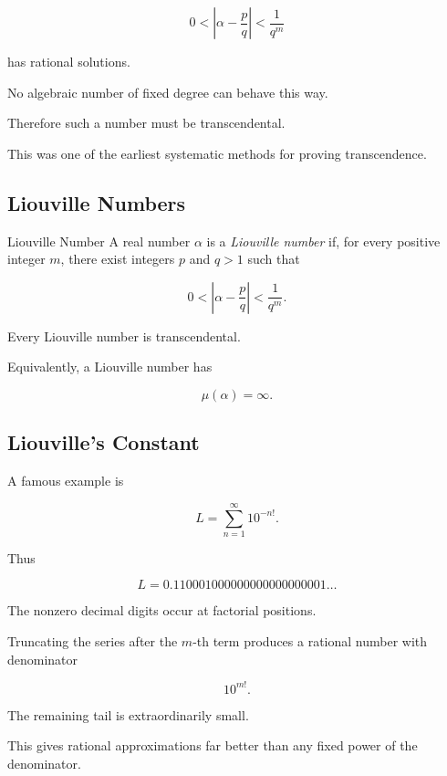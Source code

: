 \[ 0<\left|\alpha-\frac pq\right|<\frac1{q^m} \]

has rational solutions.

No algebraic number of fixed degree can behave this way.

Therefore such a number must be transcendental.

This was one of the earliest systematic methods for proving transcendence.

\subsection{Liouville Numbers}
\label{subsec:liouville-numbers}

\begin{definitionbox}{Liouville Number}
A real number \(\alpha\) is a \emph{Liouville number} if, for every positive
integer \(m\), there exist integers \(p\) and \(q>1\) such that

\[ 0<\left|\alpha-\frac pq\right|<\frac1{q^m}. \]
\end{definitionbox}

Every Liouville number is transcendental.

Equivalently, a Liouville number has

\[ \boxed{\mu(\alpha)=\infty.} \]

\subsection{Liouville's Constant}
\label{subsec:liouville-constant}

A famous example is

\[ L=\sum_{n=1}^{\infty}10^{-n!}. \]

Thus

\[
L
=
0.110001000000000000000001\ldots
\]

The nonzero decimal digits occur at factorial positions.

Truncating the series after the \(m\)-th term produces a rational number with
denominator

\[ 10^{m!}. \]

The remaining tail is extraordinarily small.

This gives rational approximations far better than any fixed power of the
denominator.

